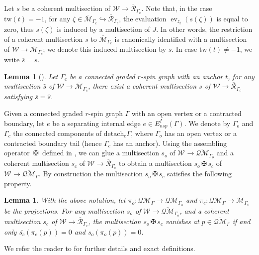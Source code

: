 \documentclass[11pt]{amsart}
\newtheorem{lem}[dummy]{Lemma}
\theoremstyle{definition}
\theoremstyle{remark}
\newcommand{\tw}{\text{tw}}
\newcommand{\Ass}{{{\,\maltese\,}}}
\newcommand{\oQMb}{{\overline{\mathcal{QM}}}}
\newcommand{\<}{\left<}
\renewcommand{\>}{\right>}
\numberwithin{equation}{section}
\def\Mbar{{\overline{\mathcal M}}}
\begin{document}
Let $s$ be a coherent multisection of $\mathcal{W} \rightarrow {\overline{\mathcal{R}}}_{\Gamma_c}$. Note that, in the case $\tw(t)=-1$, for any $\zeta\in\Mbar_{\Gamma_c} \hookrightarrow {\overline{\mathcal{R}}}_{\Gamma_c}$, the evaluation $\operatorname{ev}_{z_t}(s(\zeta))$ is equal to zero, thus $s(\zeta)$ is induced by a multisection of $J$.  In other words, the restriction of a coherent multisection $s$ to $\Mbar_{\Gamma_c}$ is canonically identified with a multisection of ${\mathcal{W}} \rightarrow \Mbar_{\Gamma_c}$; we denote this induced multisection by $\overline{s}$.  In case $\tw(t)\ne -1$, we write $\overline{s} = s$.
\begin{lem}[{\cite[Lemma 2.12]{TZ2}}]
    Let $\Gamma_c$ be a connected graded $r$-spin graph with an anchor $t$, for any multisection $\hat s$ of $\mathcal W\to \Mbar_{\Gamma_c}$,
    there exist a coherent multisection $s$ of $\mathcal W\to {\overline{\mathcal{R}}}_{\Gamma_c}$ satisfying $\overline{s}=\hat s$.
\end{lem}






Given a connected graded $r$-spin graph $\Gamma$ with an open vertex or a contracted boundary, let $e$ be a separating internal edge $e\in E_{nsp}^I(\Gamma)$. We denote by $\Gamma_o$ and $\Gamma_c$ the connected components of ${\text{detach} }_e \Gamma$, where $\Gamma_o$ has an open vertex or a contracted boundary tail (hence $\Gamma_c$ has an anchor). Using the assembling operator $\Ass$ defined in \cite[\S 4.1.3]{BCT2}, we can glue a multisection $s_o$ of $\mathcal W^{}\to \oQMb_{\Gamma_o}$ and a coherent multisection $s_c$ of $\mathcal W^{}\to {\overline{\mathcal{R}}}_{\Gamma_c}$ to obtain a multisection $s_o\Ass s_c$ of $\mathcal W^{}\to \oQMb_{\Gamma}$. By construction the multisection $s_o\Ass s_c$ satisfies the following property.

\begin{lem} \label{lem zero of assembling}
    With the above notation, let $\pi_o\colon \oQMb_\Gamma \to \oQMb_{\Gamma_o}$ and $\pi_c\colon \oQMb_\Gamma \to \Mbar_{\Gamma_c}$ be the projections.
    For any multisection $s_o$ of $\mathcal W \to \oQMb_{\Gamma_o}$, and a coherent multisection $s_c$ of $\mathcal W \to \overline{\mathcal R}_{\Gamma_c}$, the multisection $s_o\Ass s_c$ vanishes at $p\in \oQMb_\Gamma$ if and only $\overline{s_c}(\pi_c(p))=0$ and $s_o(\pi_o(p))=0$.
\end{lem}

We refer the reader to \cite[\S 4.1.3]{BCT2} for further details and exact definitions.
\end{document}
